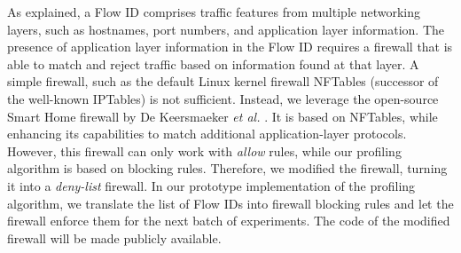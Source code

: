As explained, a Flow ID comprises traffic features from multiple networking layers, such as hostnames, port numbers, and application layer information. 
The presence of application layer information in the Flow ID requires a firewall that is able to match and reject traffic based on information found at that layer. A simple firewall, such as the default Linux kernel firewall NFTables \cite{nftables} (successor of the well-known IPTables) is not sufficient.
Instead, we leverage the open-source Smart Home firewall by De Keersmaeker \textit{et al.} \cite{smart-home-firewall}. It is based on NFTables, while enhancing its capabilities to match additional application-layer protocols.
However, this firewall can only work with \emph{allow} rules, while our profiling algorithm is based on blocking rules.
Therefore, we modified the firewall, turning it into a \emph{deny-list} firewall. 
In our prototype implementation of the profiling algorithm, we translate the list of Flow IDs into firewall blocking rules and let the firewall enforce them for the next batch of experiments.
The code of the modified firewall will be made publicly available.






